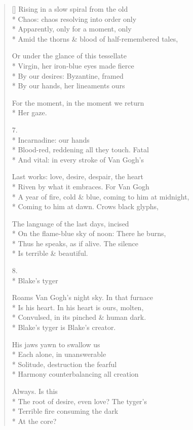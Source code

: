 \begin{verse}[\versewidth]
Rising in a slow spiral from the old\\*
Chaos: chaos resolving into order only\\*
Apparently, only for a moment, only\\*
Amid the thorns \& blood of half-remembered tales,

Or under the glance of this tessellate\\*
Virgin, her iron-blue eyes made fierce\\*
By our desires: Byzantine, framed\\*
By our hands, her lineaments ours

For the moment, in the moment we return\\*
Her gaze.

7.\\*
                 Incarnadine: our hands\\*
Blood-red, reddening all they touch. Fatal\\*
And vital: in every stroke of Van Gogh's 

Last works: love, desire, despair, the heart\\*
Riven by what it embraces. For Van Gogh\\*
A year of fire, cold \& blue, coming to him at midnight,\\*
Coming to him at dawn. Crows black glyphs,

The language of the last days, incised\\*
On the flame-blue sky of noon: There he burns,\\*
Thus he speaks, as if alive. The silence\\*
Is terrible \& beautiful.

8.\\*
                                        Blake's tyger

Roams Van Gogh's night sky. In that furnace\\*
Is his heart. In his heart is ours, molten,\\*
Convulsed, in its pinched \& human dark.\\*
Blake's tyger is Blake's creator.

His jaws yawn to swallow us\\*
Each alone, in unanswerable\\*
Solitude, destruction the fearful\\*
Harmony counterbalancing all creation

Always.      Is this\\*
The root of desire, even love?  The tyger's\\*
Terrible fire consuming the dark\\*
At the core?


\end{verse}
